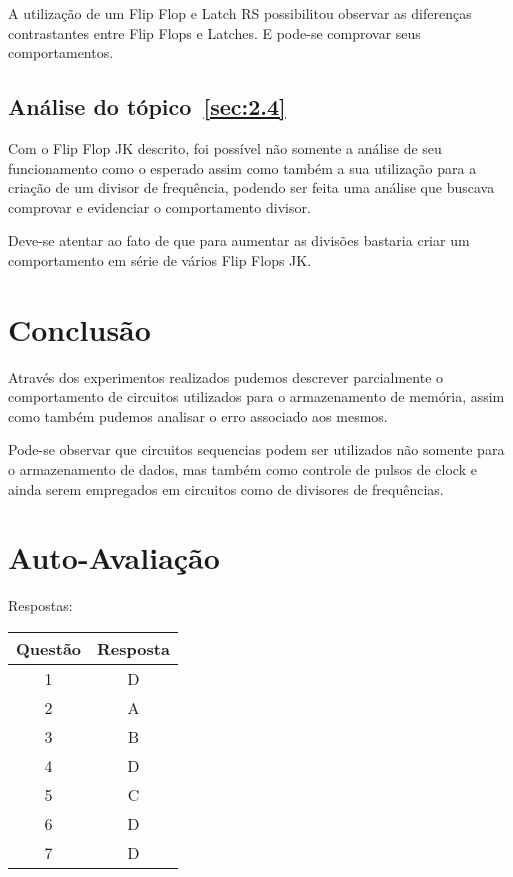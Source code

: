 \documentclass[12pt]{article}
\begin{document}
A utilização de um Flip Flop e Latch RS possibilitou observar as diferenças
contrastantes entre Flip Flops e Latches. E pode-se comprovar seus
comportamentos.

\subsection{Análise do tópico~\ref{sec:2.4}}\label{sec:analise2.4}

Com o Flip Flop JK descrito, foi possível não somente a análise de seu
funcionamento como o esperado assim como também a sua utilização para a criação
de um divisor de frequência, podendo ser feita uma análise que buscava comprovar
e evidenciar o comportamento divisor.

Deve-se atentar ao fato de que para aumentar as divisões bastaria criar um
comportamento em série de vários Flip Flops JK.

\section{Conclusão}\label{sec:Conclusao}

Através dos experimentos realizados pudemos descrever parcialmente o
comportamento de circuitos utilizados para o armazenamento de memória, assim
como também pudemos analisar o erro associado aos mesmos.

Pode-se observar que circuitos sequencias podem ser utilizados não somente para
o armazenamento de dados, mas também como controle de pulsos de clock e ainda
serem empregados em circuitos como de divisores de frequências.

\nocite{*}



\newpage
\section*{Auto-Avaliação}

Respostas:

\begin{table}[H]
      \begin{tabular}{|c|c|} \hline
      \textbf{Questão} & \textbf{Resposta}\\
      \hline
      1  & D \\ \hline
      2  & A \\ \hline
      3  & B \\ \hline
      4  & D \\ \hline
      5  & C \\ \hline
      6  & D \\ \hline
      7  & D \\ \hline
      \end{tabular}
\end{table}
\end{document}
